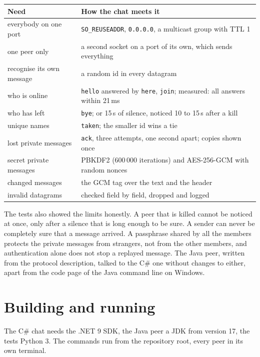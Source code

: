 \documentclass[11pt,a4paper]{article}
\newcommand{\code}[1]{{\frenchspacing\texttt{#1}}}
\begin{document}
\begin{center}
\small
\begin{tabularx}{\linewidth}{@{}p{4.4cm}X@{}}
\toprule
Need & How the chat meets it \\
\midrule
everybody on one port & \code{SO\_REUSEADDR}, \code{0.0.0.0}, a multicast group with TTL 1 \\
one peer only & a second socket on a port of its own, which sends everything \\
recognise its own message & a random id in every datagram \\
who is online & \code{hello} answered by \code{here}, \code{join}; measured: all answers within 21\,ms \\
who has left & \code{bye}; or 15\,s of silence, noticed 10 to 15\,s after a kill \\
unique names & \code{taken}; the smaller id wins a tie \\
lost private messages & \code{ack}, three attempts, one second apart; copies shown once \\
secret private messages & PBKDF2 (600\,000 iterations) and AES-256-GCM with random nonces \\
changed messages & the GCM tag over the text and the header \\
invalid datagrams & checked field by field, dropped and logged \\
\bottomrule
\end{tabularx}
\end{center}

The tests also showed the limits honestly. A peer that is killed cannot be noticed at once, only
after a silence that is long enough to be sure. A sender can never be completely sure that a message
arrived. A passphrase shared by all the members protects the private messages from strangers, not
from the other members, and authentication alone does not stop a replayed message. The Java peer,
written from the protocol description, talked to the C\# one without changes to either, apart from
the code page of the Java command line on Windows.

\appendix

\section{Building and running}\label{app:run}

The C\# chat needs the .NET 9 SDK, the Java peer a JDK from version 17, the tests Python 3. The
commands run from the repository root, every peer in its own terminal.
\end{document}
